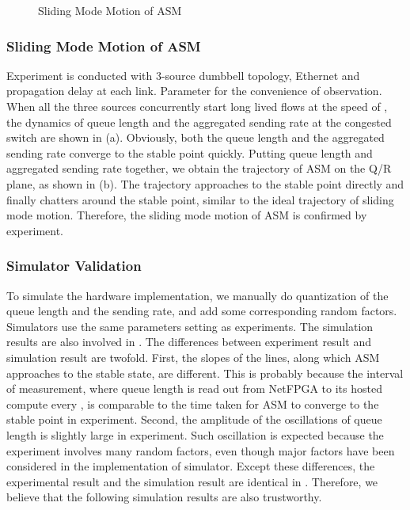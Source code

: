 \documentclass{sig-alternate-10pt}
\begin{document}
\begin{figure}
\centering
{}
\caption{Sliding Mode Motion of ASM}
\label{sliding-ASM}
\end{figure}


\subsubsection{Sliding Mode Motion of ASM}
Experiment is conducted with 3-source dumbbell topology,  Ethernet and  propagation delay at each link. Parameter  for the convenience of observation. When all the three sources concurrently start long lived flows at the speed of , the dynamics of queue length and the aggregated sending rate at the congested switch are shown in (a). Obviously, both the queue length and the aggregated sending rate converge to the stable point quickly. Putting queue length and aggregated sending rate together, we obtain the trajectory of ASM on the Q/R plane, as shown in (b). The trajectory approaches to the stable point directly and finally chatters around the stable point, similar to the ideal trajectory of sliding mode motion. Therefore, the sliding mode motion of ASM is confirmed by experiment. 


\subsubsection{Simulator Validation}
To simulate the hardware implementation, we manually do quantization of the queue length and the sending rate, and add some corresponding random factors. Simulators use the same parameters setting as experiments. The simulation results are also involved in .
The differences between experiment result and simulation result are twofold. First, the slopes of the lines, along which ASM approaches to the stable state, are different. This is probably because the interval of measurement, where queue length is read out from NetFPGA to its hosted compute every , is comparable to the time taken for ASM to converge to the stable point in experiment. Second, the amplitude of the oscillations of queue length is slightly large in experiment. Such oscillation is expected because the experiment involves many random factors, even though major factors have been considered in the implementation of simulator. Except these differences, the experimental result and the simulation result are identical in . Therefore, we believe that the following simulation results are also trustworthy.
\end{document}
